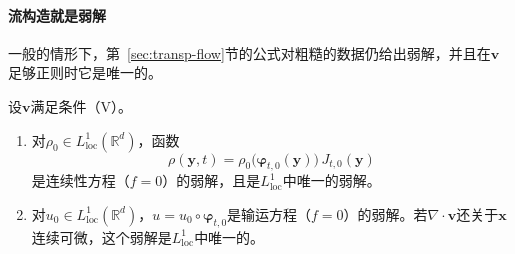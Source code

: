 \paragraph{流构造就是弱解}
一般的情形下，第~\ref{sec:transp-flow}节的公式对粗糙的数据仍给出弱解，并且在$\bm{v}$足够正则时它是唯一的。

\begin{theorem}[流构造给出弱解]
\label{thm:transp-weak}
设$\bm{v}$满足条件（V）。
\begin{enumerate}
  \item 对$\rho_0\in L^{1}_{\mathrm{loc}}(\mathbb{R}^{d})$，函数
  \begin{equation}
    \rho(\bm{y},t)=\rho_0\bigl(\bm{\varphi}_{t,0}(\bm{y})\bigr)\,J_{t,0}(\bm{y})
    \label{eq:transp-weak-density}
  \end{equation}
  是连续性方程（$f=0$）的弱解，且是$L^{1}_{\mathrm{loc}}$中唯一的弱解。
  \item 对$u_0\in L^{1}_{\mathrm{loc}}(\mathbb{R}^{d})$，$u=u_0\circ\bm{\varphi}_{t,0}$是输运方程（$f=0$）的弱解。若$\nabla\cdot\bm{v}$还关于$\bm{x}$连续可微，这个弱解是$L^{1}_{\mathrm{loc}}$中唯一的。
\end{enumerate}
\end{theorem}

